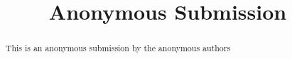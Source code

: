\documentclass[10pt,conference]{IEEEtran}
\begin{document}
\title{Anonymous Submission}
\maketitle
\begin{abstract}
    This is an anonymous submission by the anonymous authors
\end{abstract}








\end{document}
